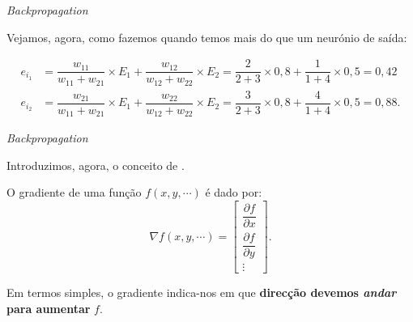 \begin{frame}{\textit{Backpropagation} \cont}

    Vejamos, agora, como fazemos quando temos mais do que um neurónio de saída:
    
    \begin{figure}
        \centering
        
    \end{figure}
    
    \vspace{-1cm}
    
    \begin{equation}
        \begin{split}
            e_{i_1} &= \dfrac{w_{11}}{w_{11} + w_{21}} \times E_1 +
            \dfrac{w_{12}}{w_{12} + w_{22}} \times E_2 = \dfrac{2}{2 + 3} \times 0,8 +
            \dfrac{1}{1 + 4} \times 0,5 = 0,42
            \\
            e_{i_2} &= \dfrac{w_{21}}{w_{11} + w_{21}} \times E_1 +
            \dfrac{w_{22}}{w_{12} + w_{22}} \times E_2 = \dfrac{3}{2 + 3} \times 0,8 +
            \dfrac{4}{1 + 4} \times 0,5 = 0,88.
        \end{split}
    \end{equation}
    

\end{frame}

\begin{frame}{\textit{Backpropagation} \cont}

    
    \medskip

    Introduzimos, agora, o conceito de .
    
    O gradiente de uma função $f(x, y, \cdots)$ é dado por:
    \begin{equation}
        \renewcommand*{\arraystretch}{2}
        \nabla f(x, y, \cdots) = \begin{bmatrix}
                \dfrac{\partial f}{\partial x} \\ 
                \dfrac{\partial f}{\partial y}\\ 
                \vdots
                \end{bmatrix}.
    \end{equation}
    
    \pauseskip
    
    Em termos simples, o gradiente indica-nos em que \textbf{direcção devemos \textit{andar} para aumentar} $f$.
    
\end{frame}


